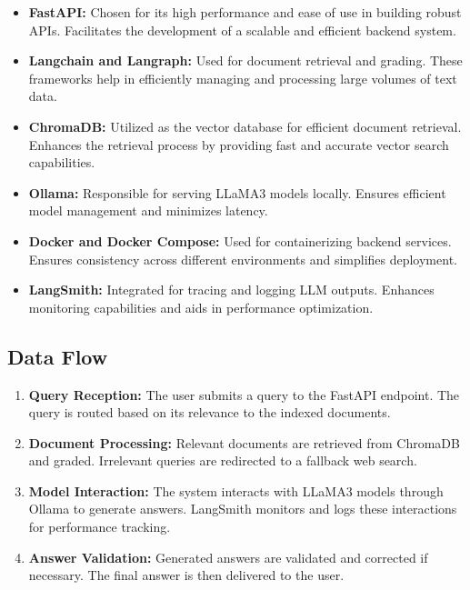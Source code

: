 \begin{itemize}
    \item \textbf{FastAPI:} Chosen for its high performance and ease of use in building robust APIs. Facilitates the development of a scalable and efficient backend system.

    \item \textbf{Langchain and Langraph:} Used for document retrieval and grading. These frameworks help in efficiently managing and processing large volumes of text data.

    \item \textbf{ChromaDB:} Utilized as the vector database for efficient document retrieval. Enhances the retrieval process by providing fast and accurate vector search capabilities.

    \item \textbf{Ollama:} Responsible for serving LLaMA3 models locally. Ensures efficient model management and minimizes latency.

    \item \textbf{Docker and Docker Compose:} Used for containerizing backend services. Ensures consistency across different environments and simplifies deployment.

    \item \textbf{LangSmith:} Integrated for tracing and logging LLM outputs. Enhances monitoring capabilities and aids in performance optimization.
\end{itemize}

\subsection{Data Flow}

\begin{enumerate}
    \item \textbf{Query Reception:} The user submits a query to the FastAPI endpoint. The query is routed based on its relevance to the indexed documents.

    \item \textbf{Document Processing:} Relevant documents are retrieved from ChromaDB and graded. Irrelevant queries are redirected to a fallback web search.

    \item \textbf{Model Interaction:} The system interacts with LLaMA3 models through Ollama to generate answers. LangSmith monitors and logs these interactions for performance tracking.

    \item \textbf{Answer Validation:} Generated answers are validated and corrected if necessary. The final answer is then delivered to the user.
\end{enumerate}

